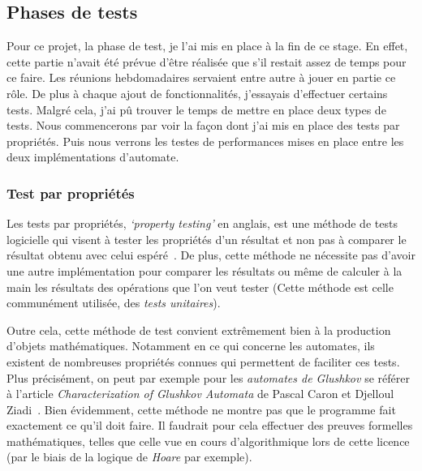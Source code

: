 \subsection{Phases de tests}

Pour ce projet, la phase de test, je l'ai mis en place à la fin de ce stage. En
effet, cette partie n'avait été prévue d'être réalisée que s'il restait assez de
temps pour ce faire. Les réunions hebdomadaires servaient entre autre à jouer en
partie ce rôle. De plus à chaque ajout de fonctionnalités, j'essayais 
d'effectuer certains tests. Malgré cela, j'ai pû trouver le temps de mettre en 
place deux types de tests. Nous commencerons par voir la façon dont j'ai mis en 
place des tests par propriétés. Puis nous verrons les testes de performances 
mises en place entre les deux implémentations d'automate.

\subsubsection{Test par propriétés}

Les tests par propriétés, \textit{`property testing'} en anglais, est une
méthode de tests logicielle qui visent à tester les propriétés d'un résultat et
non pas à comparer le résultat obtenu avec celui espéré~\cite{propertyTesting}.
De plus, cette méthode ne nécessite pas d'avoir une autre implémentation pour
comparer les résultats ou même de calculer à la main les résultats des
opérations que l'on veut tester (Cette méthode est celle communément utilisée,
des \textit{tests unitaires}).

\vphantom{}

Outre cela, cette méthode de test convient extrêmement bien à la production
d'objets mathématiques. Notamment en ce qui concerne les automates, ils existent
de nombreuses propriétés connues qui permettent de faciliter ces tests. Plus
précisément, on peut par exemple pour les \textit{automates de Glushkov} se
référer à l'article \textit{Characterization of Glushkov Automata} de Pascal
Caron et Djelloul Ziadi~\cite{CaronZiadi2001}. Bien évidemment, cette méthode ne
montre pas que le programme fait exactement ce qu'il doit faire. Il faudrait
pour cela effectuer des preuves formelles mathématiques, telles que celle vue en
cours d'algorithmique lors de cette licence (par le biais de la logique de
\textit{Hoare} par exemple).

\vphantom{}

